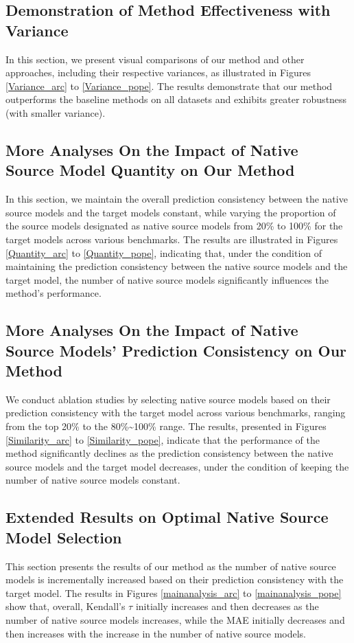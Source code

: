 \subsection{Demonstration of Method Effectiveness with Variance}
\label{apd:variance}
In this section, we present visual comparisons of our method and other approaches, including their respective variances, as illustrated in Figures \ref{Variance_arc} to \ref{Variance_pope}. The results demonstrate that our method outperforms the baseline methods on all datasets and exhibits greater robustness (with smaller variance).



\subsection{More Analyses On the Impact of Native Source Model Quantity on Our Method}
\label{apd:quantity}
In this section, we maintain the overall prediction consistency between the native source models and the target models constant, while varying the proportion of the source models designated as native source models from 20\% to 100\% for the target models across various benchmarks. The results are illustrated in Figures \ref{Quantity_arc} to \ref{Quantity_pope}, indicating that, under the condition of maintaining the prediction consistency between the native source models and the target model, the number of native source models significantly influences the method's performance.



\subsection{More Analyses On the Impact of Native Source Models' Prediction Consistency on Our Method}
\label{apd:similarity}
We conduct ablation studies by selecting native source models based on their prediction consistency with the target model across various benchmarks, ranging from the top 20\% to the 80\%\textasciitilde100\% range. The results, presented in Figures \ref{Similarity_arc} to \ref{Similarity_pope}, indicate that the performance of the method significantly declines as the prediction consistency between the native source models and the target model decreases, under the condition of keeping the number of native source models constant.


\subsection{Extended Results on Optimal Native Source Model Selection}
This section presents the results of our method as the number of native source models is incrementally increased based on their prediction consistency with the target model. The results in Figures \ref{mainanalysis_arc} to \ref{mainanalysis_pope} show that, overall, Kendall's $\tau$ initially increases and then decreases as the number of native source models increases, while the MAE initially decreases and then increases with the increase in the number of native source models. 

